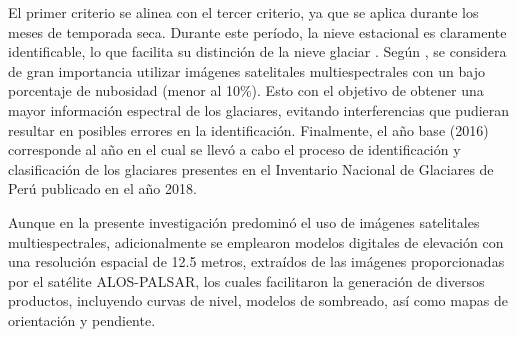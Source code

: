 El primer criterio se alinea con el tercer criterio, ya que se aplica durante los meses de temporada seca. Durante este período, la nieve estacional es claramente identificable, lo que facilita su distinción de la nieve glaciar \cite{reserva2021}. Según , se considera de gran importancia utilizar imágenes satelitales multiespectrales con un bajo porcentaje de nubosidad (menor al 10\%). Esto con el objetivo de obtener una mayor información espectral de los glaciares, evitando interferencias que pudieran resultar en posibles errores en la identificación. Finalmente, el año base (2016) corresponde al año en el cual se llevó a cabo el proceso de identificación y clasificación de los glaciares presentes en el Inventario Nacional de Glaciares de Perú publicado en el año 2018.

Aunque en la presente investigación predominó el uso de imágenes satelitales multiespectrales, adicionalmente se emplearon modelos digitales de elevación con una resolución espacial de 12.5 metros, extraídos de las imágenes proporcionadas por el satélite ALOS-PALSAR, los cuales facilitaron la generación de diversos productos, incluyendo curvas de nivel, modelos de sombreado, así como mapas de orientación y pendiente.